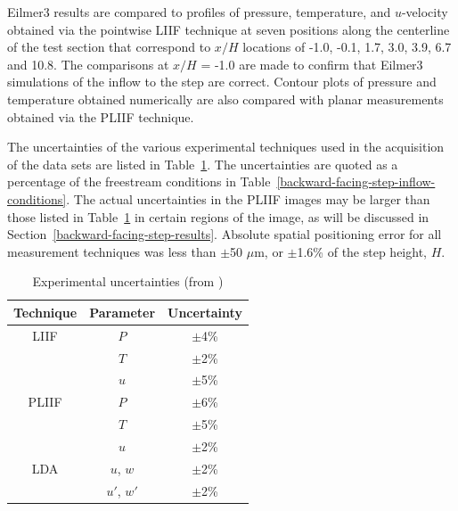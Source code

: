 Eilmer3 results are compared to profiles of pressure, temperature, and 
$u$-velocity obtained via the pointwise LIIF technique at seven positions along the 
centerline of the test section that correspond to $x/H$ locations of -1.0, -0.1, 1.7, 
3.0, 3.9, 6.7 and 10.8. The comparisons at $x/H$ = -1.0 are made to confirm that
Eilmer3 simulations of the inflow to the step are correct. Contour plots of pressure 
and temperature obtained numerically are also compared with planar measurements 
obtained via the PLIIF technique. 

The uncertainties of the various experimental techniques used in the 
acquisition of the data sets are listed in Table~\ref{backward-facing-step-uncertainties}. 
The uncertainties are quoted as a percentage of the freestream conditions in 
Table~\ref{backward-facing-step-inflow-conditions}. The actual 
uncertainties in the PLIIF images may be larger than those listed in 
Table~\ref{backward-facing-step-uncertainties} in certain regions of the image, as will be
discussed in Section~\ref{backward-facing-step-results}. Absolute spatial positioning error 
for all measurement techniques was less than $\pm$50 $\mu$m, or $\pm$1.6\% of the step 
height, $H$. 


\begin{table}
  \caption{Experimental uncertainties (from \cite{McDaniel1991}) }
  \label{backward-facing-step-uncertainties}
  \begin{center}
    \begin{tabular}{ccc}
      \hline\hline
      Technique & Parameter & Uncertainty \\
      \hline
      LIIF  & $P$ & $\pm$4\%\\
            & $T$ & $\pm$2\%\\
            & $u$ & $\pm$5\%\\
      PLIIF & $P$ & $\pm$6\%\\
            & $T$ & $\pm$5\%\\
            & $u$ & $\pm$2\%\\
      LDA   & $u$, $w$   & $\pm$2\%\\
            & $u'$, $w'$ & $\pm$2\%\\
      \hline \hline
    \end{tabular}
  \end{center}
\end{table}

